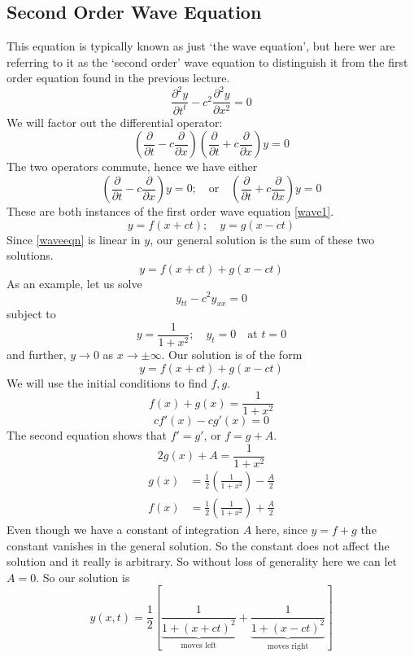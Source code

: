 \documentclass{article}
\begin{document}
	\subsection{Second Order Wave Equation}
	This equation is typically known as just `the wave equation', but here wer are referring to it as the `second order' wave equation to distinguish it from the first order equation found in the previous lecture.
	\begin{equation}\label{waveeqn}
		\frac{\partial^2 y}{\partial t^t} - c^2 \frac{\partial^2 y}{\partial x^2} = 0
	\end{equation}
	We will factor out the differential operator:
	\[ \left( \frac{\partial}{\partial t} - c\frac{\partial}{\partial x} \right)\left( \frac{\partial}{\partial t} + c\frac{\partial}{\partial x} \right)y = 0 \]
	The two operators commute, hence we have either
	\[ \left( \frac{\partial}{\partial t} - c\frac{\partial}{\partial x} \right) y = 0;\quad\text{or}\quad \left( \frac{\partial}{\partial t} + c\frac{\partial}{\partial x} \right) y = 0 \]
	These are both instances of the first order wave equation \eqref{wave1}.
	\[ y = f(x+ct);\quad y=g(x-ct) \]
	Since \eqref{waveeqn} is linear in $y$, our general solution is the sum of these two solutions.
	\[ y = f(x+ct) + g(x-ct) \]
	As an example, let us solve
	\[ y_{tt} - c^2 y_{xx} = 0 \]
	subject to
	\[ y = \frac{1}{1+x^2}; \quad y_t = 0\quad \text{at }t=0 \]
	and further, $y \to 0$ as $x \to \pm \infty$. Our solution is of the form
	\[ y = f(x+ct) + g(x-ct) \]
	We will use the initial conditions to find $f, g$.
	\[ f(x) + g(x) = \frac{1}{1+x^2} \]
	\[ cf'(x) - cg'(x) = 0 \]
	The second equation shows that $f'=g'$, or $f=g+A$.
	\[ 2g(x) + A = \frac{1}{1+x^2} \]
	\begin{align*}
		g(x) &= \frac{1}{2}\left( \frac{1}{1+x^2} \right) - \frac{A}{2} \\
		f(x) &= \frac{1}{2}\left( \frac{1}{1+x^2} \right) + \frac{A}{2}
	\end{align*}
	Even though we have a constant of integration $A$ here, since $y=f+g$ the constant vanishes in the general solution. So the constant does not affect the solution and it really is arbitrary. So without loss of generality here we can let $A = 0$. So our solution is
	\[ y(x, t) = \frac{1}{2}\left[ \underbrace{\frac{1}{1+(x+ct)^2}}_{\text{moves left}} + \underbrace{\frac{1}{1+(x-ct)^2}}_{\text{moves right}} \right] \]
\end{document}
